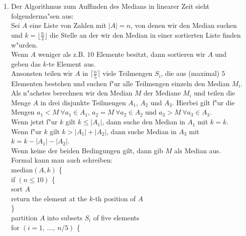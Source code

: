 \documentclass[a4paper,10pt]{scrartcl}
\begin{document}
\vspace*{1cm}
\begin{enumerate}[1.]

\item Der Algorithmus zum Auffinden des Medians in linearer Zeit sieht folgenderma"sen aus:\\
Sei $A$ eine Liste von Zahlen mit $|A| = n$, von denen wir den Median suchen und $k = \lfloor \frac{n}{2} \rfloor$ die Stelle an der wir den Median in einer sortierten Liste finden w"urden.\\
 Wenn $A$ weniger als z.B. $10$ Elemente besitzt, dann sortieren wir $A$ und geben das $k$-te Element aus.\\
 Ansonsten teilen wir $A$ in $\lceil \frac{n}{5} \rceil$ viele Teilmengen $S_i$, die aus (maximal) $5$ Elementen bestehen und suchen f"ur alle Teilmengen einzeln den Median $M_i$.\\
 Als n"achstes berechnen wir den Median $M$ der Mediane $M_i$ und teilen die Menge $A$ in drei disjunkte Teilmengen $A_1$, $A_2$ und $A_3$. Hierbei gilt f"ur die Mengen $a_1 < M ~\forall{a_1 \in A_1}$, $a_2 = M ~\forall{a_2 \in A_2}$ und $a_3 > M ~\forall{a_3 \in A_3}$.\\
Wenn jetzt f"ur $k$ gilt $k \leq |A_1|$, dann suche den Median in $A_1$ mit $k = k$.\\
Wenn f"ur $k$ gilt $k > |A_1| + |A_2|$, dann suche Median in $A_3$ mit $k = k - |A_1| - |A_2|$.\\
Wenn keine der beiden Bedingungen gilt, dann gib $M$ als Median aus.\\
\newline
Formal kann man auch schreiben:\\
\newline
median$(A,k)$ \{\\
    \hspace*{5 mm} if $(n \leq 10)$ \{\\
    \hspace*{10 mm} sort $A$\\
    \hspace*{10 mm} return the element at the $k$-th position of $A$\\
    \hspace*{5 mm} \}\\
    \hspace*{5 mm} partition $A$ into subsets $S_i$ of five elements\\
    \hspace*{5 mm} for $(i = 1, ~\dots ,~ n/5)$ \{\\

\end{enumerate}
\end{document}
